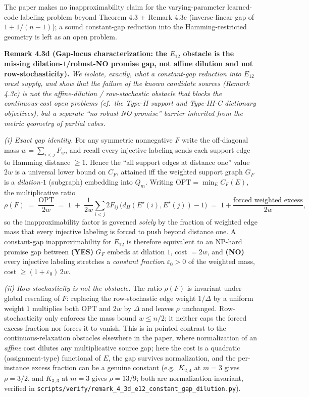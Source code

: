 \documentclass[
]{article}
\begin{document}
The paper makes no inapproximability claim for the varying-parameter
learned-code labeling problem beyond Theorem 4.3 + Remark 4.3c
(inverse-linear gap of $1 + 1/(n-1)$); a sound constant-gap reduction
into the Hamming-restricted geometry is left as an open problem.

\textbf{Remark 4.3d (Gap-locus characterization: the $E_{12}$
obstacle is the missing dilation-$1$/robust-NO promise gap, not affine
dilution and not row-stochasticity).}
\emph{We isolate, exactly, what a constant-gap reduction into $E_{12}$
must supply, and show that the failure of the known candidate sources
(Remark 4.3c) is not the affine-dilution / row-stochastic obstacle that
blocks the continuous-cost open problems (cf.\ the Type-II support and
Type-III-C dictionary objectives), but a separate ``no robust NO
promise'' barrier inherited from the metric geometry of partial cubes.}

\emph{(i) Exact gap identity.} For any symmetric nonnegative $F$ write
the off-diagonal mass $w = \sum_{i<j} F_{ij}$, and recall every
injective labeling sends each support edge to Hamming distance
$\geq 1$. Hence the ``all support edges at distance one'' value $2w$ is
a universal lower bound on $C_F$, attained iff the weighted support
graph $G_F$ is a \emph{dilation-$1$} (subgraph) embedding into $Q_m$.
Writing $\mathrm{OPT} = \min_E C_F(E)$, the multiplicative ratio
\[
\rho(F) \;=\; \frac{\mathrm{OPT}}{2w}
\;=\; 1 \;+\; \frac{1}{2w}\!\!\sum_{i<j} 2F_{ij}\,
\bigl(d_H(E^\star(i),E^\star(j)) - 1\bigr)
\;=\; 1 + \frac{\text{forced weighted excess}}{2w},
\]
so the inapproximability factor is governed \emph{solely} by the
fraction of weighted edge mass that every injective labeling is forced
to push beyond distance one. A constant-gap inapproximability for
$E_{12}$ is therefore equivalent to an NP-hard promise gap between
\textbf{(YES)} $G_F$ embeds at dilation $1$, cost $=2w$, and
\textbf{(NO)} every injective labeling stretches a \emph{constant
fraction} $\varepsilon_0 > 0$ of the weighted mass, cost
$\geq (1+\varepsilon_0)\,2w$.

\emph{(ii) Row-stochasticity is not the obstacle.} The ratio
$\rho(F)$ is invariant under global rescaling of $F$: replacing the
row-stochastic edge weight $1/\Delta$ by a uniform weight $1$ multiplies
both $\mathrm{OPT}$ and $2w$ by $\Delta$ and leaves $\rho$ unchanged.
Row-stochasticity only enforces the mass bound $w \leq n/2$; it neither
caps the forced excess fraction nor forces it to vanish. This is in
pointed contrast to the continuous-relaxation obstacles elsewhere in
the paper, where normalization of an \emph{affine} cost dilutes any
multiplicative source gap; here the cost is a quadratic
(assignment-type) functional of $E$, the gap survives normalization,
and the per-instance excess fraction can be a genuine constant
(e.g.\ $K_{2,4}$ at $m=3$ gives $\rho = 3/2$, and $K_{3,3}$ at $m=3$
gives $\rho = 13/9$; both are normalization-invariant, verified in
\texttt{scripts/verify/remark\_4\_3d\_e12\_constant\_gap\_dilution.py}).
\end{document}
